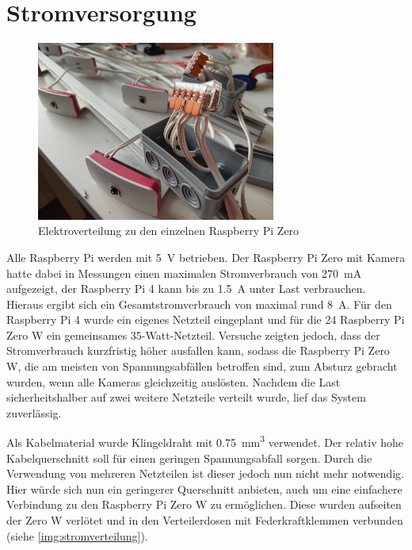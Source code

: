 \documentclass[./00PhotoBox.tex]{subfiles}
\begin{document}
\section{Stromversorgung}

\begin{figure}
    \centering
    \includegraphics[width=0.7\textwidth]{./img/stromverteilung.jpg}
    \caption{Elektroverteilung zu den einzelnen Raspberry Pi Zero} %
    \label{img:stromverteilung} %
\end{figure}

Alle Raspberry Pi werden mit \SI{5}{\volt} betrieben. Der Raspberry Pi Zero mit Kamera hatte dabei in Messungen einen maximalen Stromverbrauch von \SI{270}{\milli\ampere} aufgezeigt, der Raspberry Pi 4 kann bis zu \SI{1,5}{\ampere} unter Last verbrauchen. Hieraus ergibt sich ein Gesamtstromverbrauch von maximal rund \SI{8}{\ampere}. Für den Raspberry Pi 4 wurde ein eigenes Netzteil eingeplant und für die 24 Raspberry Pi Zero W ein gemeinsames 35-Watt-Netzteil. Versuche zeigten jedoch, dass der Stromverbrauch kurzfristig höher ausfallen kann, sodass die Raspberry Pi Zero W, die am meisten von Spannungsabfällen betroffen sind, zum Absturz gebracht wurden, wenn alle Kameras gleichzeitig auslösten. Nachdem die Last sicherheitshalber auf zwei weitere Netzteile verteilt wurde, lief das System zuverlässig.

Als Kabelmaterial wurde Klingeldraht mit \SI{0,75}{\cubic\milli\metre} verwendet. Der relativ hohe Kabelquerschnitt soll für einen geringen Spannungsabfall sorgen. Durch die Verwendung von mehreren Netzteilen ist dieser jedoch nun nicht mehr notwendig. Hier würde sich nun ein geringerer Querschnitt anbieten, auch um eine einfachere Verbindung zu den Raspberry Pi Zero W zu ermöglichen. Diese wurden aufseiten der Zero W verlötet und in den Verteilerdosen mit Federkraftklemmen verbunden (siehe \autoref{img:stromverteilung}).
\end{document}
